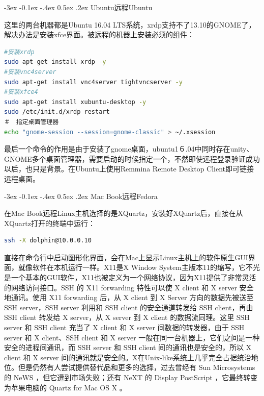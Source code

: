 \documentclass[12pt]{book}
\makeatletter
\numberwithin{dummy}{section}
\theoremstyle{ocrenumbox}
\theoremstyle{blacknumex}
\theoremstyle{blacknumbox}
\theoremstyle{ocrenum}
\renewcommand{\subsection}{\@startsection {subsection}{2}{\z@}
	{-3ex \@plus -0.1ex \@minus -.4ex}
	{0.5ex \@plus.2ex }
	{\normalfont\sffamily\bfseries}}
\makeatother
\begin{document}
\subsection{Ubuntu远程Ubuntu}

这里的两台机器都是Ubuntu 16.04 LTS系统，xrdp支持不了13.10的GNOME了，解决办法是安装xfce界面。被远程的机器上安装必须的组件：

\begin{lstlisting}[language=Bash]
#安装xrdp
sudo apt-get install xrdp -y
#安装vnc4server
sudo apt-get install vnc4server tightvncserver -y
#安装xfce4
sudo apt-get install xubuntu-desktop -y
sudo /etc/init.d/xrdp restart
＃　指定桌面管理器
echo "gnome-session --session=gnome-classic" > ~/.xsession
\end{lstlisting}

最后一个命令的作用是由于安装了gnome桌面，ubuntu1６.04中同时存在unity、GNOME多个桌面管理器，需要启动的时候指定一个，不然即使远程登录验证成功以后，也只是背景。在Ubuntu上使用Remmina Remote Desktop Client即可链接远程桌面。

\subsection{Mac Book远程Fedora}

在Mac Book远程Linux主机选择的是XQuartz，安装好XQuartz后，直接在从XQuartz打开的终端中运行：

\begin{lstlisting}[language=Bash]
ssh -X dolphin@10.0.0.10
\end{lstlisting}

直接在命令行中启动图形化界面，会在Mac上显示Linux主机上的软件原生GUI界面，就像软件在本机运行一样。X11是X Window System主版本11的缩写，它不光是一个基本的GUI软件，X11也被定义为一个网络协议，因为X11提供了非常灵活的网络访问接口。SSH 的 X11 forwarding 特性可以使 X client 和 X server 安全地通讯。使用 X11 forwarding 后，从 X client 到 X Server 方向的数据先被送至 SSH server，SSH server 利用和 SSH client 的安全通道转发给 SSH client，再由 SSH client 转发给 X server，从 X server 到 X client 的数据流同理。这里 SSH server 和 SSH client 充当了 X client 和 X server 间数据的转发器，由于 SSH server 和 X client、SSH client 和 X server 一般在同一台机器上，它们之间是一种安全的进程间通讯，而 SSH server 和 SSH client 间的通讯也是安全的，所以 X client 和 X server 间的通讯就是安全的。X在Unix-like系统上几乎完全占据统治地位。但是仍然有人尝试提供替代品和更多的选择，过去曾经有 Sun Microsystems 的 NeWS ，但它遭到市场失败；还有 NeXT 的 Display PostScript ，它最终转变为苹果电脑的 Quartz for Mac OS X 。
\end{document}
